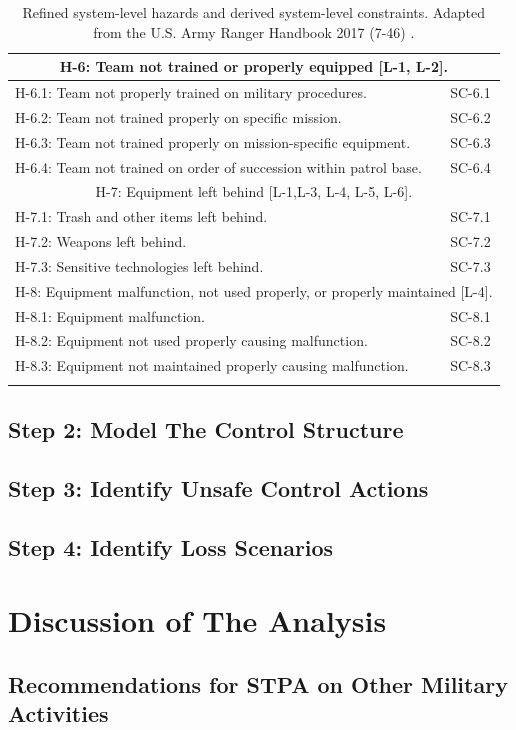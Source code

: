 \documentclass[../../main/main.tex]{subfiles}
\begin{document}
\begin{longtable}[h]{ | m{7.5cm} |  m{7.5cm} | }
\hline
\multicolumn{2}{|c|}{H-6: Team not trained or properly equipped [L-1, L-2].}\\
\hline
H-6.1: Team not properly trained on military procedures.
 & 
SC-6.1\\
\hline
H-6.2: Team not trained properly on specific mission.
 & 
SC-6.2\\
\hline
H-6.3: Team not trained properly on mission-specific equipment.
 & 
SC-6.3\\
\hline
H-6.4: Team not trained on order of succession within patrol base.
 & 
SC-6.4\\

\hline
\multicolumn{2}{|c|}{H-7: Equipment left behind [L-1,L-3, L-4, L-5, L-6].}\\
\hline
H-7.1: Trash and other items left behind.
 & 
SC-7.1\\
\hline
H-7.2: Weapons left behind.
 & 
SC-7.2\\
\hline
H-7.3: Sensitive technologies left behind.
 & 
SC-7.3\\

\hline
\multicolumn{2}{|c|}{H-8: Equipment malfunction, not used properly, or properly maintained [L-4].}\\
\hline
H-8.1: Equipment malfunction.
 & 
SC-8.1\\
\hline
H-8.2: Equipment not used properly causing malfunction.
 & 
SC-8.2\\
\hline
H-8.3: Equipment not maintained properly causing malfunction.
 & 
SC-8.3\\
\hline

\caption{Refined system-level hazards and derived system-level constraints.  Adapted from the U.S. Army Ranger Handbook 2017 (7-46) \cite{rangermanual}\label{slconstraints}.}\\

\end{longtable}
\parskip=18pt


\subsection{Step 2: Model The Control Structure}


\subsection{Step 3: Identify Unsafe Control Actions}
\subsection{Step 4: Identify Loss Scenarios}

\section{Discussion of The Analysis}
\subsection{Recommendations for STPA on Other Military Activities}
\end{document}
